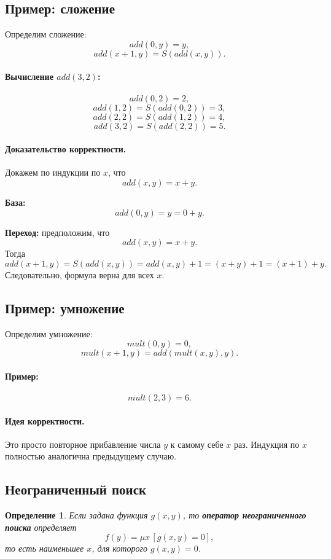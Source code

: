 \documentclass[12pt,a4paper]{article}
\newtheorem{definition}{Определение}
\begin{document}
\subsection{Пример: сложение}
Определим сложение:
\[
add(0,y)=y,
\]
\[
add(x+1,y)=S(add(x,y)).
\]

\paragraph{Вычисление $add(3,2)$:}
\[
add(0,2)=2,
\]
\[
add(1,2)=S(add(0,2))=3,
\]
\[
add(2,2)=S(add(1,2))=4,
\]
\[
add(3,2)=S(add(2,2))=5.
\]

\paragraph{Доказательство корректности.}
Докажем по индукции по $x$, что
\[
add(x,y)=x+y.
\]

\textbf{База:}
\[
add(0,y)=y=0+y.
\]

\textbf{Переход:}
предположим, что
\[
add(x,y)=x+y.
\]
Тогда
\[
add(x+1,y)=S(add(x,y))=add(x,y)+1=(x+y)+1=(x+1)+y.
\]
Следовательно, формула верна для всех $x$.

\subsection{Пример: умножение}
Определим умножение:
\[
mult(0,y)=0,
\]
\[
mult(x+1,y)=add(mult(x,y),y).
\]

\paragraph{Пример:}
\[
mult(2,3)=6.
\]

\paragraph{Идея корректности.}
Это просто повторное прибавление числа $y$ к самому себе $x$ раз. Индукция по $x$ полностью аналогична предыдущему случаю.

\subsection{Неограниченный поиск}
\begin{definition}
Если задана функция $g(x,y)$, то \textbf{оператор неограниченного поиска} определяет
\[
f(y)=\mu x\,[g(x,y)=0],
\]
то есть наименьшее $x$, для которого $g(x,y)=0$.
\end{definition}
\end{document}
